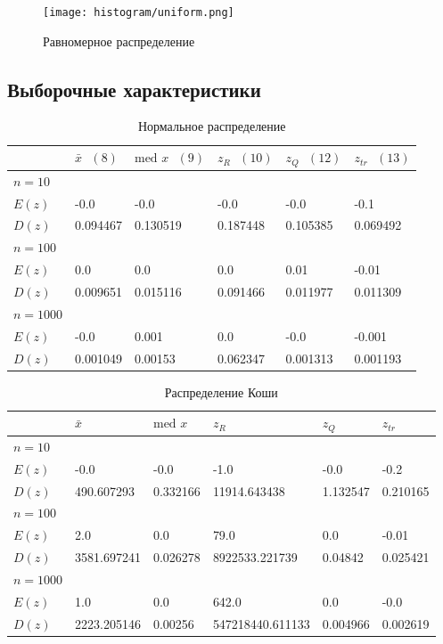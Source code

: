 \documentclass[12pt,a4paper]{article}
\begin{document}
\begin{figure}[h!]
	\centering
	\texttt{[image: histogram/uniform.png]}
	\caption{Равномерное распределение}
	\label{fig:image}
\end{figure}
\pagebreak

\subsection{Выборочные характеристики}
\begin{table}[h!]
	\centering
	\begin{tabular}{|l|l|l|l|l|l|}
		\hline&$\bar x\text{	} \hyperref[8]{(8)}$ &$\text{med }x\text{	} \hyperref[9]{(9)}$  &$z_R\text{	} \hyperref[10]{(10)}$  &$z_Q\text{	} \hyperref[12]{(12)}$  &$z_{tr}\text{	} \hyperref[13]{(13)}$  \\ \hline
		$n=10$&&&&& \\ \hline$E(z)$&-0.0&-0.0&-0.0&-0.0&-0.1 \\ \hline$D(z)$&0.094467&0.130519&0.187448&0.105385&0.069492 \\ \hline
		
		$n=100$&&&&& \\ \hline$E(z)$&0.0&0.0&0.0&0.01&-0.01 \\ \hline$D(z)$&0.009651&0.015116&0.091466&0.011977&0.011309 \\ \hline
		
		$n=1000$&&&&& \\ \hline$E(z)$&-0.0&0.001&0.0&-0.0&-0.001 \\ \hline$D(z)$&0.001049&0.00153&0.062347&0.001313&0.001193 \\ \hline
		
	\end{tabular}
	\caption{Нормальное распределение}
\end{table}

\begin{table}[h!]
	\centering
	\begin{tabular}{|l|l|l|l|l|l|}
		\hline&$\bar x$ &$\text{med }x$  &$z_R$  &$z_Q$  &$z_{tr}$  \\ \hline
		$n=10$&&&&& \\ \hline$E(z)$&-0.0&-0.0&-1.0&-0.0&-0.2 \\ \hline$D(z)$&490.607293&0.332166&11914.643438&1.132547&0.210165 \\ \hline
		
		$n=100$&&&&& \\ \hline$E(z)$&2.0&0.0&79.0&0.0&-0.01 \\ \hline$D(z)$&3581.697241&0.026278&8922533.221739&0.04842&0.025421 \\ \hline
		
		$n=1000$&&&&& \\ \hline$E(z)$&1.0&0.0&642.0&0.0&-0.0 \\ \hline$D(z)$&2223.205146&0.00256&547218440.611133&0.004966&0.002619 \\ \hline
	\end{tabular}
	\label{tab:cauchy}
	\caption{Распределение Коши}
\end{table}
\end{document}
